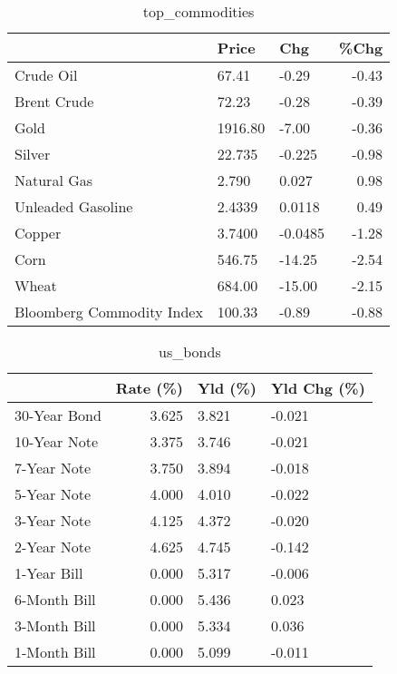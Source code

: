 \documentclass{article}%
\begin{document}
\begin{table}[htbp]%
\caption{top\_commodities}%
\centering%
\begin{adjustbox}{width=1\textwidth}%
\begin{tabular}{lllr}
\toprule
                          &   Price &     Chg &  \%Chg \\
\midrule
               Crude Oil  &   67.41 &   -0.29 & -0.43 \\
             Brent Crude  &   72.23 &   -0.28 & -0.39 \\
                    Gold  & 1916.80 &   -7.00 & -0.36 \\
                  Silver  &  22.735 &  -0.225 & -0.98 \\
             Natural Gas  &   2.790 &   0.027 &  0.98 \\
       Unleaded Gasoline  &  2.4339 &  0.0118 &  0.49 \\
                  Copper  &  3.7400 & -0.0485 & -1.28 \\
                    Corn  &  546.75 &  -14.25 & -2.54 \\
                   Wheat  &  684.00 &  -15.00 & -2.15 \\
Bloomberg Commodity Index &  100.33 &   -0.89 & -0.88 \\
\bottomrule
\end{tabular}
%
\end{adjustbox}%
\end{table}

%


\begin{table}[htbp]%
\caption{us\_bonds}%
\centering%
\begin{adjustbox}{width=1\textwidth}%
\begin{tabular}{lrll}
\toprule
             &  Rate (\%) & Yld (\%) & Yld Chg (\%) \\
\midrule
30-Year Bond &     3.625 &   3.821 &      -0.021 \\
10-Year Note &     3.375 &   3.746 &      -0.021 \\
 7-Year Note &     3.750 &   3.894 &      -0.018 \\
 5-Year Note &     4.000 &   4.010 &      -0.022 \\
 3-Year Note &     4.125 &   4.372 &      -0.020 \\
 2-Year Note &     4.625 &   4.745 &      -0.142 \\
 1-Year Bill &     0.000 &   5.317 &      -0.006 \\
6-Month Bill &     0.000 &   5.436 &       0.023 \\
3-Month Bill &     0.000 &   5.334 &       0.036 \\
1-Month Bill &     0.000 &   5.099 &      -0.011 \\
\bottomrule
\end{tabular}
%
\end{adjustbox}%
\end{table}
\end{document}
